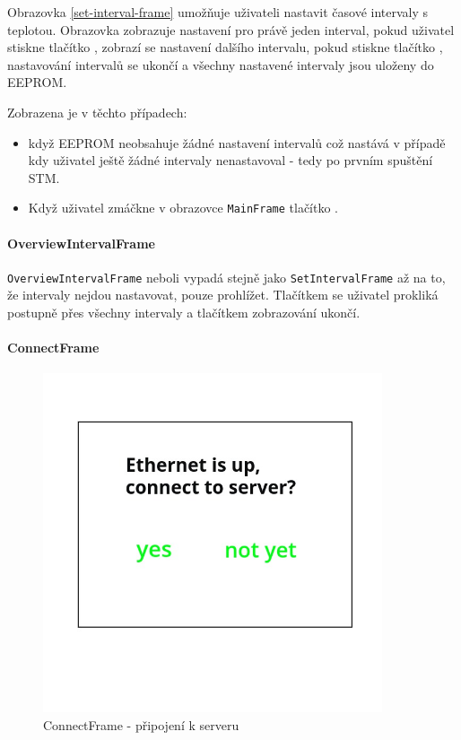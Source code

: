 Obrazovka \ref{set-interval-frame} umožňuje uživateli nastavit časové intervaly s teplotou.
Obrazovka zobrazuje nastavení pro právě jeden interval, pokud uživatel stiskne tlačítko
, zobrazí se nastavení dalšího intervalu, pokud stiskne tlačítko , nastavování
intervalů se ukončí a všechny nastavené intervaly jsou uloženy do EEPROM.

Zobrazena je v těchto případech:
\begin{itemize}
  \item když EEPROM neobsahuje žádné nastavení intervalů což nastává v případě kdy uživatel
    ještě žádné intervaly nenastavoval - tedy po prvním spuštění STM.
  \item Když uživatel zmáčkne v obrazovce \texttt{MainFrame} tlačítko .
\end{itemize}

\paragraph{OverviewIntervalFrame}
\texttt{OverviewIntervalFrame} neboli  vypadá stejně
jako \texttt{SetIntervalFrame} až na to, že intervaly nejdou nastavovat, pouze prohlížet.
Tlačítkem  se uživatel prokliká postupně přes všechny intervaly a tlačítkem  zobrazování
ukončí.

\paragraph{ConnectFrame}
\begin{figure}[H]\centering
\includegraphics[width=100mm, height=100mm]{../img/connect_frame.jpg}
\caption{ConnectFrame - připojení k serveru}
\label{connect-frame}
\end{figure}

